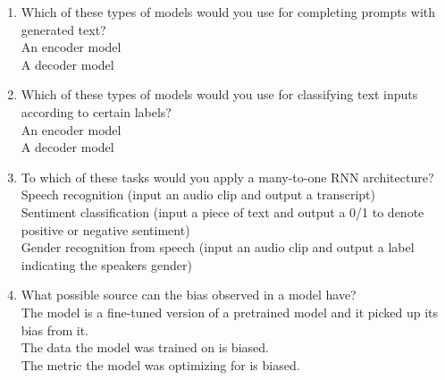 \begin{enumerate}
    
    \item Which of these types of models would you use for completing prompts with generated text? \\ 
        \hspace{1cm}\choice{} An encoder model \\ 
        \hspace{1cm}\checkmark A decoder model \\ 
        \solution{}
    \item Which of these types of models would you use for classifying text inputs according to certain labels? \\ 
        \hspace{1cm}\checkmark An encoder model \\ 
        \hspace{1cm}\choice{} A decoder model \\ 
        \solution{}
    \item To which of these tasks would you apply a many-to-one RNN architecture? \\ 
        \hspace{1cm}\choice{} Speech recognition (input an audio clip and output a transcript) \\ 
        \hspace{1cm}\checkmark Sentiment classification (input a piece of text and output a 0/1 to denote positive or negative sentiment) \\ 
        \hspace{1cm}\checkmark Gender recognition from speech (input an audio clip and output a label indicating the speakers gender) \\ 
        \solution{}
    \item What possible source can the bias observed in a model have?  \\ 
        \hspace{1cm}\checkmark The model is a fine-tuned version of a pretrained model and it picked up its bias from it. \\ 
        \hspace{1cm}\checkmark The data the model was trained on is biased. \\ 
        \hspace{1cm}\checkmark The metric the model was optimizing for is biased. \\ 
        \solution{}
    

\end{enumerate}

